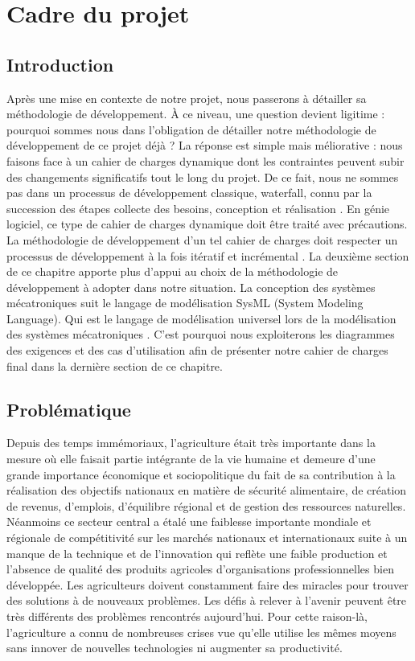 
\chapter{ Cadre du projet }
\clearpage
\section*{Introduction }
Après une mise en contexte de notre projet, nous passerons à détailler sa méthodologie de développement.
\`A ce niveau, une question devient ligitime : pourquoi sommes nous dans l'obligation de détailler notre méthodologie de développement de ce projet déjà ?
La réponse est simple mais méliorative : nous faisons face à un cahier de charges dynamique dont les contraintes peuvent subir des changements significatifs tout le long du projet. 
De ce fait, nous ne sommes pas dans un processus de développement classique, waterfall, connu par la succession des étapes collecte des besoins, conception et réalisation \cite{SoftwareEngeneering1}.
En génie logiciel, ce type de cahier de charges dynamique doit être traité avec précautions.
La méthodologie de développement d'un tel cahier de charges doit respecter un processus de développement à la fois itératif et incrémental \cite{SoftwareEngeneering3,SoftwareEngeneering2}.
La deuxième section de ce chapitre apporte plus d'appui au choix de la méthodologie de développement à adopter dans notre situation.
La conception des systèmes mécatroniques suit le langage de modélisation SysML (System Modeling Language). Qui est le langage de modélisation universel lors de la modélisation des systèmes mécatroniques \corr{[Ref]}. C'est pourquoi nous exploiterons les diagrammes des exigences et des cas d'utilisation afin de présenter notre cahier de charges final dans la dernière section de ce chapitre.

\section{Problématique }
Depuis des temps immémoriaux, l'agriculture était très importante dans la mesure où elle faisait partie intégrante de la vie humaine et demeure d'une grande importance économique et sociopolitique du fait de sa contribution à la réalisation des objectifs nationaux en matière de sécurité alimentaire, de création de revenus, d'emplois, d'équilibre régional et de gestion des ressources naturelles. Néanmoins ce secteur central a étalé une faiblesse importante mondiale et régionale de compétitivité sur les marchés nationaux et internationaux suite à un manque de la technique et de l'innovation qui reflète une faible production et l'absence de qualité des produits agricoles d'organisations professionnelles bien développée. Les agriculteurs doivent constamment faire des miracles pour trouver des solutions à de nouveaux problèmes. Les défis à relever à l'avenir peuvent être très différents des problèmes rencontrés aujourd'hui. Pour cette raison-là, l'agriculture a connu de nombreuses crises vue qu'elle utilise les mêmes moyens sans innover de nouvelles technologies ni augmenter sa productivité.

